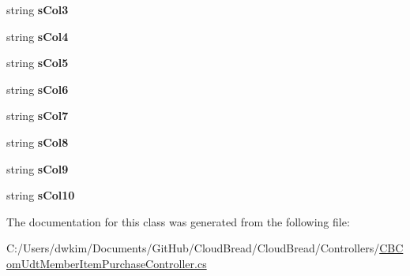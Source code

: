 \begin{DoxyCompactItemize}
\item 
string {\bfseries s\+Col3}\hypertarget{a00112_a8eda213ac64a3ea1106171a834316329}{}\label{a00112_a8eda213ac64a3ea1106171a834316329}

\item 
string {\bfseries s\+Col4}\hypertarget{a00112_a5f0b174488a29eae1177546ec1f9ba6c}{}\label{a00112_a5f0b174488a29eae1177546ec1f9ba6c}

\item 
string {\bfseries s\+Col5}\hypertarget{a00112_aa5637602372e019f6fa326047d219a74}{}\label{a00112_aa5637602372e019f6fa326047d219a74}

\item 
string {\bfseries s\+Col6}\hypertarget{a00112_acb37a0afa1babbca2fe7f6d10e7cee13}{}\label{a00112_acb37a0afa1babbca2fe7f6d10e7cee13}

\item 
string {\bfseries s\+Col7}\hypertarget{a00112_a6a302bd149e634e8cd4fe2d24f6a0976}{}\label{a00112_a6a302bd149e634e8cd4fe2d24f6a0976}

\item 
string {\bfseries s\+Col8}\hypertarget{a00112_a81f1f7886edd698672af394745c1fd7b}{}\label{a00112_a81f1f7886edd698672af394745c1fd7b}

\item 
string {\bfseries s\+Col9}\hypertarget{a00112_a9302d58b0b78fdc6465b1e7b47dd01e7}{}\label{a00112_a9302d58b0b78fdc6465b1e7b47dd01e7}

\item 
string {\bfseries s\+Col10}\hypertarget{a00112_a32f7167dc2f056a56fc3d8ce7e06a91c}{}\label{a00112_a32f7167dc2f056a56fc3d8ce7e06a91c}

\end{DoxyCompactItemize}


The documentation for this class was generated from the following file\+:\begin{DoxyCompactItemize}
\item 
C\+:/\+Users/dwkim/\+Documents/\+Git\+Hub/\+Cloud\+Bread/\+Cloud\+Bread/\+Controllers/\hyperlink{a00213}{C\+B\+Com\+Udt\+Member\+Item\+Purchase\+Controller.\+cs}\end{DoxyCompactItemize}
